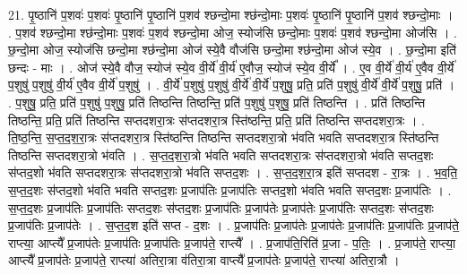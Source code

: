 \documentclass[17pt]{extarticle}
\begin{document}
21. पृ॒ष्ठानि॑ प॒शवः॑ प॒शवः॑ पृ॒ष्ठानि॑ पृ॒ष्ठानि॑ प॒शव॑ श्छन्दो॒मा श्छ॑न्दो॒माः प॒शवः॑ पृ॒ष्ठानि॑ पृ॒ष्ठानि॑ प॒शव॑ श्छन्दो॒माः । . प॒शव॑ श्छन्दो॒मा श्छ॑न्दो॒माः प॒शवः॑ प॒शव॑ श्छन्दो॒मा ओज॒ स्योज॑सि छन्दो॒माः प॒शवः॑ प॒शव॑ श्छन्दो॒मा ओज॑सि । . छ॒न्दो॒मा ओज॒ स्योज॑सि छन्दो॒मा श्छ॑न्दो॒मा ओज॑ स्ये॒वै वौज॑सि छन्दो॒मा श्छ॑न्दो॒मा ओज॑ स्ये॒व । . छ॒न्दो॒मा इति॑ छन्दः - माः । . ओज॑ स्ये॒वै वौज॒ स्योज॑ स्ये॒व वी॒र्ये॑ वी॒र्य॑ ए॒वौज॒ स्योज॑ स्ये॒व वी॒र्ये᳚ । . ए॒व वी॒र्ये॑ वी॒र्य॑ ए॒वैव वी॒र्ये॑ प॒शुषु॑ प॒शुषु॑ वी॒र्य॑ ए॒वैव वी॒र्ये॑ प॒शुषु॑ । . वी॒र्ये॑ प॒शुषु॑ प॒शुषु॑ वी॒र्ये॑ वी॒र्ये॑ प॒शुषु॒ प्रति॒ प्रति॑ प॒शुषु॑ वी॒र्ये॑ वी॒र्ये॑ प॒शुषु॒ प्रति॑ । . प॒शुषु॒ प्रति॒ प्रति॑ प॒शुषु॑ प॒शुषु॒ प्रति॑ तिष्ठन्ति तिष्ठन्ति॒ प्रति॑ प॒शुषु॑ प॒शुषु॒ प्रति॑ तिष्ठन्ति । . प्रति॑ तिष्ठन्ति तिष्ठन्ति॒ प्रति॒ प्रति॑ तिष्ठन्ति सप्तदशरा॒त्रः स॑प्तदशरा॒त्र स्ति॑ष्ठन्ति॒ प्रति॒ प्रति॑ तिष्ठन्ति सप्तदशरा॒त्रः । . ति॒ष्ठ॒न्ति॒ स॒प्त॒द॒श॒रा॒त्रः स॑प्तदशरा॒त्र स्ति॑ष्ठन्ति तिष्ठन्ति सप्तदशरा॒त्रो भ॑वति भवति सप्तदशरा॒त्र स्ति॑ष्ठन्ति तिष्ठन्ति सप्तदशरा॒त्रो भ॑वति । . स॒प्त॒द॒श॒रा॒त्रो भ॑वति भवति सप्तदशरा॒त्रः स॑प्तदशरा॒त्रो भ॑वति सप्तद॒शः स॑प्तद॒शो भ॑वति सप्तदशरा॒त्रः स॑प्तदशरा॒त्रो भ॑वति सप्तद॒शः । . स॒प्त॒द॒श॒रा॒त्र इति॑ सप्तदश - रा॒त्रः । . भ॒व॒ति॒ स॒प्त॒द॒शः स॑प्तद॒शो भ॑वति भवति सप्तद॒शः प्र॒जाप॑तिः प्र॒जाप॑तिः सप्तद॒शो भ॑वति भवति सप्तद॒शः प्र॒जाप॑तिः । . स॒प्त॒द॒शः प्र॒जाप॑तिः प्र॒जाप॑तिः सप्तद॒शः स॑प्तद॒शः प्र॒जाप॑तिः प्र॒जाप॑तेः प्र॒जाप॑तेः प्र॒जाप॑तिः सप्तद॒शः स॑प्तद॒शः प्र॒जाप॑तिः प्र॒जाप॑तेः । . स॒प्त॒द॒श इति॑ सप्त - द॒शः । . प्र॒जाप॑तिः प्र॒जाप॑तेः प्र॒जाप॑तेः प्र॒जाप॑तिः प्र॒जाप॑तिः प्र॒जाप॑ते॒ राप्त्या॒ आप्त्यै᳚ प्र॒जाप॑तेः प्र॒जाप॑तिः प्र॒जाप॑तिः प्र॒जाप॑ते॒ राप्त्यै᳚ । . प्र॒जाप॑ति॒रिति॑ प्र॒जा - प॒तिः॒ । . प्र॒जाप॑ते॒ राप्त्या॒ आप्त्यै᳚ प्र॒जाप॑तेः प्र॒जाप॑ते॒ राप्त्या॑ अतिरा॒त्रा व॑तिरा॒त्रा वाप्त्यै᳚ प्र॒जाप॑तेः प्र॒जाप॑ते॒ राप्त्या॑ अतिरा॒त्रौ । \newline
\end{document}
